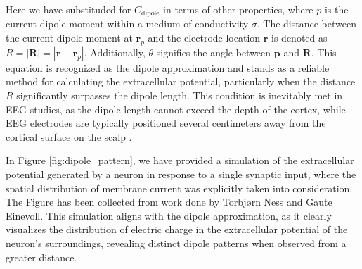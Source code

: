 \documentclass[a4paper, UKenglish, 11pt]{uiomaster}
\begin{document}
Here we have substituded for $C_\text{dipole}$ in terms of other properties, where $p$ is the current dipole moment within a medium of conductivity $\sigma$. The distance between the current dipole moment at $\textbf{r}_p$ and the electrode location $\textbf{r}$ is denoted as $R = |\textbf{R}| = |\textbf{r} - \textbf{r}_p|$. Additionally, $\theta$ signifies the angle between $\textbf{p}$ and $\textbf{R}$. This equation is recognized as the dipole approximation and stands as a reliable method for calculating the extracellular potential, particularly when the distance $R$ significantly surpasses the dipole length. This condition is inevitably met in EEG studies, as the dipole length cannot exceed the depth of the cortex, while EEG electrodes are typically positioned several centimeters away from the cortical surface on the scalp \cite{naess2021biophysically}.

In Figure \ref{fig:dipole_pattern}, we have provided a simulation of the extracellular potential generated by a neuron in response to a single synaptic input, where the spatial distribution of membrane current was explicitly taken into consideration. The Figure has been collected from work done by Torbjørn Ness and Gaute Einevoll. This simulation aligns with the dipole approximation, as it clearly visualizes the distribution of electric charge in the extracellular potential of the neuron's surroundings, revealing distinct dipole patterns when observed from a greater distance.
\end{document}

